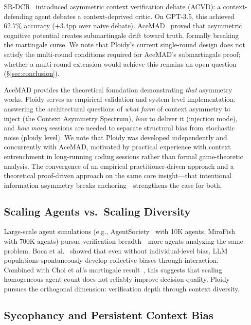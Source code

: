 \documentclass[11pt]{article}
\begin{document}
SR-DCR~\citep{srdcr2025} introduced asymmetric context verification debate (ACVD): a context-defending agent debates a context-deprived critic. On GPT-3.5, this achieved 62.7\% accuracy (+3.4pp over naive debate). AceMAD~\citep{liu2026acemad} proved that asymmetric cognitive potential creates submartingale drift toward truth, formally breaking the martingale curse. We note that Ploidy's current single-round design does not satisfy the multi-round conditions required for AceMAD's submartingale proof; whether a multi-round extension would achieve this remains an open question (\S\ref{sec:conclusion}).

AceMAD provides the theoretical foundation demonstrating \emph{that} asymmetry works. Ploidy serves as empirical validation and system-level implementation: answering the architectural questions of \emph{what form} of context asymmetry to inject (the Context Asymmetry Spectrum), \emph{how} to deliver it (injection mode), and \emph{how many} sessions are needed to separate structural bias from stochastic noise (ploidy level). We note that Ploidy was developed independently and concurrently with AceMAD, motivated by practical experience with context entrenchment in long-running coding sessions rather than formal game-theoretic analysis. The convergence of an empirical practitioner-driven approach and a theoretical proof-driven approach on the same core insight---that intentional information asymmetry breaks anchoring---strengthens the case for both.

\subsection{Scaling Agents vs.\ Scaling Diversity}
\label{sec:scaling}

Large-scale agent simulations (e.g., AgentSociety~\citep{pang2025agentsociety} with 10K agents, MiroFish with 700K agents) pursue verification breadth---more agents analyzing the same problem. Boca et al.~\citep{boca2025emergent} showed that even without individual-level bias, LLM populations spontaneously develop collective biases through interaction. Combined with Choi et al.'s martingale result~\citep{choi2025debate}, this suggests that scaling homogeneous agent count does not reliably improve decision quality. Ploidy pursues the orthogonal dimension: verification depth through context diversity.

\subsection{Sycophancy and Persistent Context Bias}
\label{sec:sycophancy}
\end{document}
